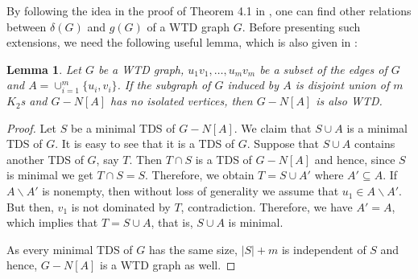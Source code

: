 \documentclass[11pt]{article}
\newtheorem{lemma}[theorem]{Lemma}
\theoremstyle{definition}
\begin{document}
By following the idea in the proof of Theorem 4.1 in \cite{HaRa97},
one can find other relations between $\delta(G)$ and $g(G)$ of a WTD graph $G$.
Before presenting such extensions, we need the following useful lemma, which is also given in \cite{HaRa97}:
\begin{lemma}\label{lem:wtdreduction}
Let $G$ be a WTD graph, $u_1v_1,\dots, u_mv_m$ be a subset of the edges of $G$ and $A=\cup_{i=1}^m \{u_i,v_i\}$.
If the subgraph of $G$ induced by $A$ is disjoint union of $m$ $K_2$s and $G-N[A]$ has no isolated vertices,
then $G-N[A]$ is also WTD.
\end{lemma}
\begin{proof}
Let $S$ be a minimal TDS of $G-N[A]$.
We claim that $S\cup A$ is a minimal TDS of $G$.
It is easy to see that it is a TDS of $G$.
Suppose that $S\cup A$ contains another TDS of $G$, say $T$.
Then $T\cap S$ is a TDS of $G-N[A]$ and hence, since $S$ is minimal we get $T\cap S=S$.
Therefore, we obtain $T=S\cup A'$ where $A'\subseteq A$.
If $A\backslash A'$ is nonempty, then without loss of generality we assume that $u_1 \in A\backslash A'$.
But then, $v_1$ is not dominated by $T$, contradiction.
Therefore, we have $A'=A$, which implies that $T=S\cup A$, that is, $S\cup A$ is minimal.

As every minimal TDS of $G$ has the same size, $|S|+m$ is independent of $S$ and hence,
$G-N[A]$ is a WTD graph as well.
\end{proof}
\end{document}
